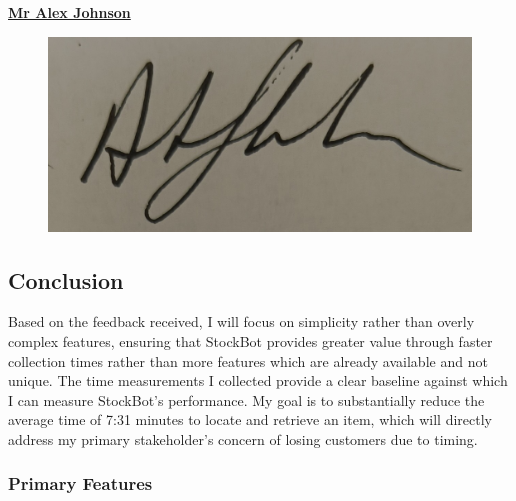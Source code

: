 \textbf{\underline{Mr Alex Johnson}} \newline

\begin{figure}[!htbp]
    \centering
    \includegraphics[width=0.2\linewidth]{IMG_20241213_124653362~2.jpg}
\end{figure}


\newpage

\subsection{Conclusion}

Based on the feedback received, I will focus on simplicity rather than overly complex features, ensuring that StockBot provides greater value through faster collection times rather than more features which are already available and not unique. The time measurements I collected provide a clear baseline against which I can measure StockBot's performance. My goal is to substantially reduce the average time of 7:31 minutes to locate and retrieve an item, which will directly address my primary stakeholder's concern of losing customers due to timing.

\subsubsection{Primary Features}

